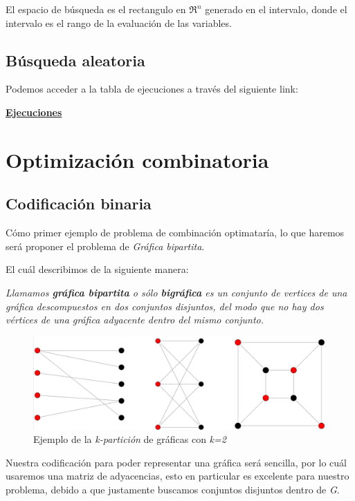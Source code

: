 \documentclass{article}
\begin{document}
El espacio de búsqueda es el rectangulo en $\mathfrak{R}^n$ generado en el intervalo, donde el intervalo es el rango de la evaluación de las variables.
\subsection*{Búsqueda aleatoria}
Podemos acceder a la tabla de ejecuciones a través del siguiente link: 

\href{./evaluationTracking.txt}{\textbf{Ejecuciones}}

\newpage
\section*{Optimización combinatoria}

\subsection*{Codificación binaria}
Cómo primer ejemplo de problema de combinación optimataría, lo que 
haremos será proponer el problema de \textit{Gráfica bipartita}.

El cuál describimos de la siguiente manera:

\textit{Llamamos \textbf{gráfica bipartita} o sólo \textbf{bigráfica} es un conjunto de vertices de una gráfica descompuestos en dos conjuntos disjuntos, del modo que no hay dos vértices de una gráfica adyacente dentro del mismo conjunto.}

\begin{figure}[h]
\begin{center}
\includegraphics[scale=0.25]{./img/bigrafica}
\caption{Ejemplo de la \textit{k-partición} de gráficas con \textit{k=2}}
\end{center}
\end{figure}

Nuestra codificación para poder representar una gráfica será 
sencilla, por lo cuál usaremos una matriz de adyacencias, esto en
particular es excelente para nuestro problema, debido a que 
justamente buscamos conjuntos disjuntos dentro de \textit{G}.
\end{document}
